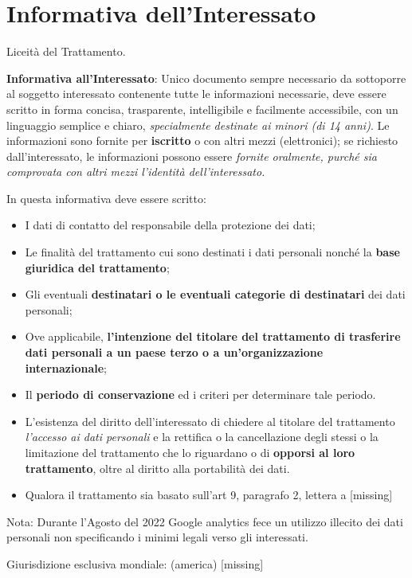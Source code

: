 \documentclass[twocolumn]{article}
\newcommand{\definition}[1]{\begin{mycolorbox}[colback=colorone]
\fontfamily{qcr}\selectfont #1 \fontfamily{cmr}\selectfont
\end{mycolorbox}}
\begin{document}
\section{Informativa dell'Interessato}
Liceità del Trattamento.
\definition{\textbf{Informativa all'Interessato}: Unico documento sempre necessario da sottoporre al soggetto interessato contenente tutte le informazioni necessarie, deve essere scritto in forma concisa, trasparente, intelligibile e facilmente accessibile, con un linguaggio semplice e chiaro, \textit{specialmente destinate ai minori (di 14 anni)}. Le informazioni sono fornite per \textbf{iscritto} o con altri mezzi (elettronici); se richiesto dall'interessato, le informazioni possono essere \textit{fornite oralmente, purché sia comprovata con altri mezzi l'identità dell'interessato.} } In questa informativa deve essere scritto: \begin{itemize}
    \item I dati di contatto del responsabile della protezione dei dati;
    \item Le finalità del trattamento cui sono destinati i dati personali nonché la \textbf{base giuridica del trattamento};
    \item Gli eventuali \textbf{destinatari o le eventuali categorie di destinatari} dei dati personali;
    \item Ove applicabile, \textbf{l'intenzione del titolare del trattamento di trasferire dati personali a un paese terzo o a un'organizzazione internazionale};
    \item Il \textbf{periodo di conservazione} ed i criteri per determinare tale periodo.
    \item L'esistenza del diritto dell'interessato di chiedere al titolare del trattamento \textit{l'accesso ai dati personali} e la rettifica o la cancellazione degli stessi o la limitazione del trattamento che lo riguardano o di \textbf{opporsi al loro trattamento}, oltre al diritto alla portabilità dei dati.
    \item Qualora il trattamento sia basato sull'art 9, paragrafo 2, lettera a [missing]
\end{itemize}
Nota: Durante l'Agosto del 2022 Google analytics fece un utilizzo illecito dei dati personali non specificando i minimi legali verso gli interessati. 

Giurisdizione esclusiva mondiale: (america) [missing]
\end{document}
